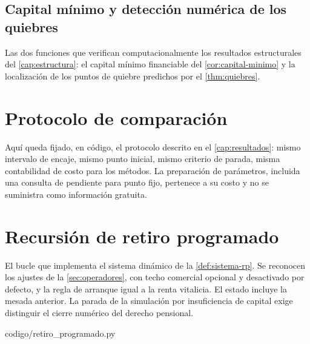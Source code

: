 

\subsection{Capital mínimo y detección numérica de los quiebres}

Las dos funciones que verifican computacionalmente los resultados estructurales
del \cref{cap:estructura}: el capital mínimo financiable del
\cref{cor:capital-minimo} y la localización de los puntos de quiebre predichos por
el \cref{thm:quiebres}.



\section{Protocolo de comparación}

Aquí queda fijado, en código, el protocolo descrito en el
\cref{cap:resultados}: mismo intervalo de encaje, mismo punto inicial, mismo
criterio de parada, misma contabilidad de costo para los \datoNMetodos{}
métodos. La preparación de parámetros, incluida una consulta de pendiente para
punto fijo, pertenece a su costo y no se suministra como información gratuita.



\section{Recursión de retiro programado}

El bucle que implementa el sistema dinámico de la \cref{def:sistema-rp}. Se
reconocen los ajustes de la \cref{sec:operadores}, con techo comercial opcional y
desactivado por defecto, y la regla de arranque igual a la renta vitalicia. El
estado incluye la mesada anterior. La parada de la simulación por insuficiencia
de capital exige distinguir el cierre numérico del derecho pensional.

%
{codigo/retiro_programado.py}

\fi
